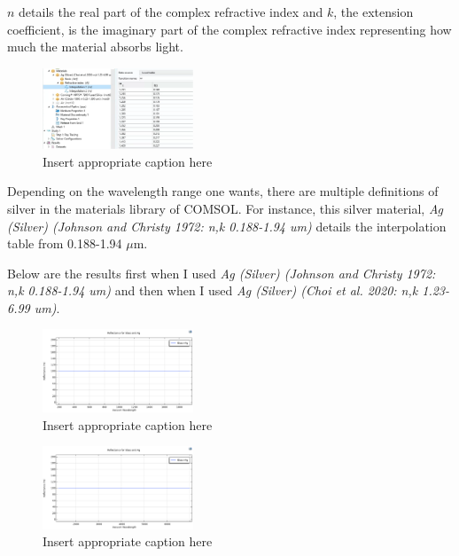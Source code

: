 $n$ details the real part of the complex refractive index and $k$, the extension coefficient, is the imaginary part of the complex refractive index representing how much the material absorbs light.


\begin{figure}[ht!]
  \centering
  \includegraphics[width=0.4\textwidth]{Chapters/Figures/Chapter 4 Figures/Interpolation Table for Silver.png}
  \caption{Insert appropriate caption here}
  \label{fig:Insert appropriate label here}
\end{figure}

Depending on the wavelength range one wants, there are multiple definitions of silver in the materials library of COMSOL. For instance, this silver material, \emph{Ag (Silver) (Johnson and Christy 1972: n,k 0.188-1.94 um)} details the interpolation table from 0.188-1.94 $\mu$m.

Below are the results first when I used \emph{Ag (Silver) (Johnson and Christy 1972: n,k 0.188-1.94 um)} and then when I used \emph{Ag (Silver) (Choi et al. 2020: n,k 1.23-6.99 um)}.

\begin{figure}[ht!]
  \centering
  \includegraphics[width=0.4\textwidth]{Chapters/Figures/Chapter 4 Figures/Reflectance for glass and Ag (Johnson and Christy).png}
  \caption{Insert appropriate caption here}
  \label{fig:Insert appropriate label here}
\end{figure}

\begin{figure}[ht!]
  \centering
  \includegraphics[width=0.4\textwidth]{Chapters/Figures/Chapter 4 Figures/Reflectance for glass and Ag for Choi et al.png}
  \caption{Insert appropriate caption here}
  \label{fig:Insert appropriate label here}
\end{figure}


